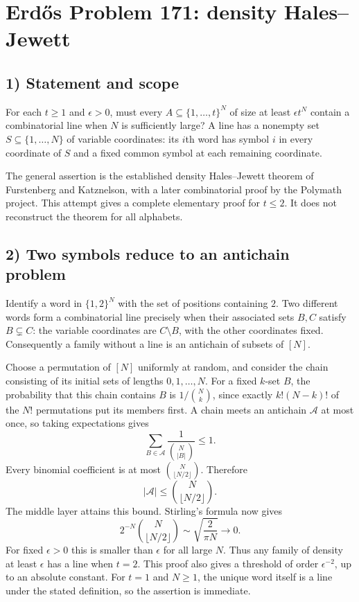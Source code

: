 \section{Erd\H{o}s Problem 171: density Hales--Jewett}

\subsection{1) Statement and scope}
For each $t\geq1$ and $\epsilon>0$, must every
$A\subseteq\{1,\ldots,t\}^N$ of size at least $\epsilon t^N$ contain
a combinatorial line when $N$ is sufficiently large?
A line has a nonempty set $S\subseteq\{1,\ldots,N\}$ of variable
coordinates: its $i$th word has symbol $i$ in every coordinate of $S$
and a fixed common symbol at each remaining coordinate.

The general assertion is the established density Hales--Jewett theorem
of Furstenberg and Katznelson, with a later combinatorial proof by the
Polymath project. This attempt gives a complete elementary proof for
$t\leq2$. It does not reconstruct the theorem for all alphabets.

\subsection{2) Two symbols reduce to an antichain problem}
Identify a word in $\{1,2\}^N$ with the set of positions containing $2$.
Two different words form a combinatorial line precisely when their
associated sets $B,C$ satisfy $B\subsetneq C$: the variable coordinates
are $C\setminus B$, with the other coordinates fixed.
Consequently a family without a line is an antichain of subsets of $[N]$.

Choose a permutation of $[N]$ uniformly at random, and consider the chain
consisting of its initial sets of lengths $0,1,\ldots,N$.
For a fixed $k$-set $B$, the probability that this chain contains $B$
is $1/\binom Nk$, since exactly $k!(N-k)!$ of the $N!$ permutations
put its members first. A chain meets an antichain $\mathcal A$ at most
once, so taking expectations gives
\[
 \sum_{B\in\mathcal A}\frac1{\binom N{|B|}}\leq1.
\]
Every binomial coefficient is at most $\binom N{\lfloor N/2\rfloor}$.
Therefore
\[
 |\mathcal A|\leq\binom N{\lfloor N/2\rfloor}.
\]
The middle layer attains this bound. Stirling's formula now gives
\[
 2^{-N}\binom N{\lfloor N/2\rfloor}
 \sim\sqrt{\frac2{\pi N}}\longrightarrow0.
\]
For fixed $\epsilon>0$ this is smaller than $\epsilon$ for all large
$N$. Thus any family of density at least $\epsilon$ has a line when
$t=2$. This proof also gives a threshold of order $\epsilon^{-2}$,
up to an absolute constant. For $t=1$ and $N\geq1$, the unique word
itself is a line under the stated definition, so the assertion is immediate.

